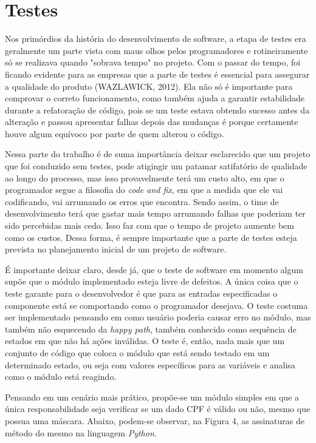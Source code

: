 \documentclass[
    12pt,       %
    openright,      %
    twoside,      %
    a4paper,      %
    english,      %
    french,       %
    spanish,      %
    brazil,       %
    ]{abntex2}
\begin{document}
  \chapter{Testes}
      Nos primórdios da história do desenvolvimento de software, a etapa de testes
      era geralmente um parte vista com maus olhos pelos programadores e rotineiramente
      só se realizava quando "sobrava tempo" no projeto. Com o passar do tempo, foi
      ficando evidente para as empresas que a parte de testes é essencial para
      assegurar a qualidade do produto (WAZLAWICK, 2012). Ela não só é importante
      para comprovar o correto funcionamento, como também ajuda a garantir
      estabilidade durante a refatoração de código, pois se um teste estava obtendo
      sucesso antes da alteração e passou apresentar falhas depois das mudanças é
      porque certamente houve algum equívoco por parte de quem alterou o código.

      Nessa parte do trabalho é de suma importância deixar esclarecido
      que um projeto que foi conduzido sem testes, pode atigingir um patamar
      satifatório de qualidade ao longo do processo, mas isso provavelmente terá um
      custo alto, em que o programador segue a filosofia do \textit{code and fix},
      em que a medida que ele vai codificando, vai arrumando os erros que encontra.
      Sendo assim, o time de desenvolvimento terá que gastar mais tempo arrumando
      falhas que poderiam ter sido percebidas mais cedo. Isso faz com que o tempo
      de projeto aumente bem como os custos. Dessa forma, é sempre importante que
      a parte de testes esteja prevista no planejamento inicial de um projeto de software.

      É importante deixar claro, desde já, que o teste de software em momento
      algum supõe que o módulo implementado esteja livre de defeitos. A única coisa que o
      teste garante para o desenvolvedor é que para as entradas especificadas o
      componente está se comportando como o programador desejava. O teste costuma
      ser implementado pensando em como usuário poderia causar erro no módulo, mas
      também não esquecendo da \textit{happy path}, também conhecido como sequência
      de estados em que não há ações inválidas. O teste é, então, nada mais que um conjunto
      de código que coloca o módulo que está sendo testado em um determinado estado,
      ou seja com valores específicos para as variáveis e analisa como o módulo está
      reagindo.

      Pensando em um cenário mais prático, propõe-se um módulo simples em que a única
      responsabilidade seja verificar se um dado CPF é válido ou não, mesmo que possua uma
      máscara. Abaixo, podem-se observar, na Figura 4, as assinaturas de método do
      mesmo na linguagem
      \textit{Python}.
\end{document}
